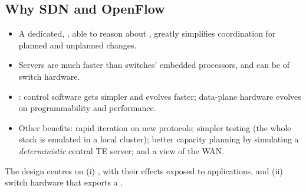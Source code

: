 \subsection{Why SDN and OpenFlow}
\begin{itemize}
\item A dedicated, , able to reason about , greatly simplifies coordination for planned and unplanned changes.
\item Servers are much faster than switches' embedded processors, and can be  of switch hardware.
\item {}: control software gets simpler and evolves faster; data-plane hardware evolves on programmability and performance.
\item Other benefits: rapid iteration on new protocols; simpler testing (the whole stack is emulated in a local cluster); better capacity planning by simulating a \emph{deterministic} central TE server; and a  view of the WAN.
\end{itemize}
The design centres on (i) , with their effects exposed to applications, and (ii) switch hardware that exports a .

